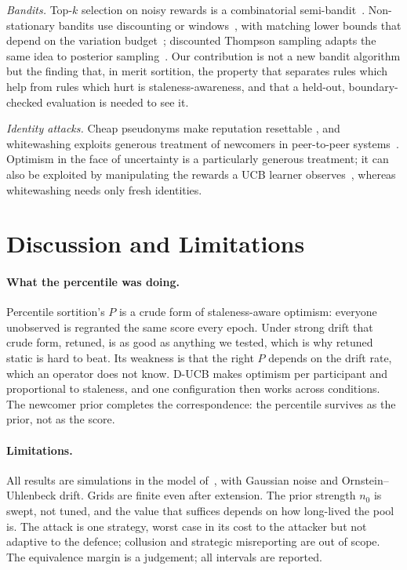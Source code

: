 \documentclass[sigconf,anonymous,review,nonacm]{acmart}
\begin{document}
\emph{Bandits.} Top-$k$ selection on noisy rewards is a combinatorial
semi-bandit~\cite{chen2013combinatorial,kveton2015tight}. Non-stationary bandits use
discounting or windows~\cite{garivier2011switching}, with matching lower bounds that
depend on the variation budget~\cite{besbes2014nonstationary}; discounted Thompson sampling
adapts the same idea to posterior sampling~\cite{raj2017taming}. Our contribution is not a
new bandit algorithm but the finding that, in merit sortition, the property that separates
rules which help from rules which hurt is staleness-awareness, and that a held-out,
boundary-checked evaluation is needed to see it.

\emph{Identity attacks.} Cheap pseudonyms make reputation resettable
\cite{friedman2001pseudonyms}, and whitewashing exploits generous treatment of newcomers in
peer-to-peer systems~\cite{feldman2006freeriding}. Optimism in the face of uncertainty is a
particularly generous treatment; it can also be exploited by manipulating the rewards a UCB
learner observes~\cite{kocabay2026optimism}, whereas whitewashing needs only fresh
identities.

\section{Discussion and Limitations}

\paragraph{What the percentile was doing.} Percentile sortition's $P$ is a crude form of
staleness-aware optimism: everyone unobserved is regranted the same score every epoch.
Under strong drift that crude form, retuned, is as good as anything we tested, which is why
retuned static is hard to beat. Its weakness is that the right $P$ depends on the drift rate,
which an operator does not know. D-UCB makes optimism per participant and proportional to
staleness, and one configuration then works across conditions. The newcomer prior completes
the correspondence: the percentile survives as the prior, not as the score.

\paragraph{Limitations.} All results are simulations in the model of~\cite{kruijssen2024},
with Gaussian noise and Ornstein--Uhlenbeck drift. Grids are finite even after extension.
The prior strength $n_0$ is swept, not tuned, and the value that suffices depends on how
long-lived the pool is. The attack is one strategy, worst case in its cost to the attacker
but not adaptive to the defence; collusion and strategic misreporting are out of scope. The equivalence margin is a
judgement; all intervals are reported.
\end{document}
